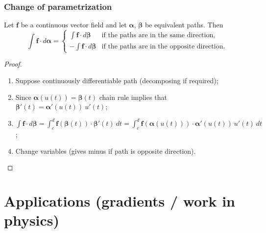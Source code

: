 \documentclass[aspectratio=169,handout]{beamer}
\newcommand{\ff}{\mathbf{f}}
\newcommand{\aalpha}{\boldsymbol{\alpha}}
\newcommand{\bbeta}{\boldsymbol{\beta}}
\begin{document}
\begin{frame}
    \frametitle{Change of parametrization}

    \begin{theorem}
        Let \(\ff\) be a continuous vector field and let \(\aalpha\), \(\bbeta\) be equivalent paths.
        Then
        \[
            \int \ff \cdot d\aalpha =
            \begin{cases}
                \int \ff \cdot d\bbeta   & \text{if the paths are in the same direction},     \\
                - \int \ff \cdot d\bbeta & \text{if the paths are in the opposite direction}.
            \end{cases}
        \]
    \end{theorem}

    \begin{proof}
        \begin{enumerate}
            \item Suppose continuously differentiable path (decomposing if required);
            \item Since \(\aalpha(u(t)) = \bbeta(t)\) chain rule implies that
                  \( \bbeta'(t) = \aalpha'(u(t)) \ u'(t)\);
            \item
                  \(\displaystyle \int \ff \cdot  d\bbeta = \displaystyle \int_c^d \ff(\bbeta(t)) \cdot \bbeta'(t) \ dt =  \displaystyle \int_c^d \ff(\aalpha(u(t))) \cdot \aalpha'(u(t)) \ u'(t) \ dt \);
            \item Change variables (gives minus if path is opposite direction). \qedhere
        \end{enumerate}
    \end{proof}
\end{frame}

\section{Applications (gradients / work in physics)}
\end{document}

